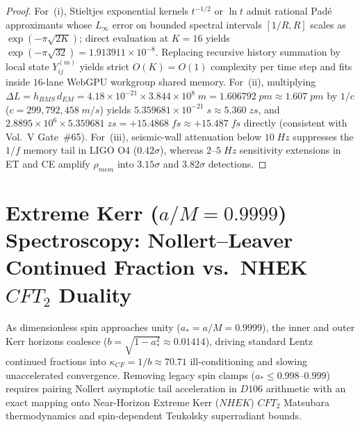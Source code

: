 \documentclass[11pt,a4paper,reqno]{article}
\def\mathrm#1{#1}%
\def\mathcal#1{#1}%
\def\mathbb#1{#1}%
\def\Done{D106}%
\theoremstyle{plain}
\theoremstyle{definition}
\theoremstyle{remark}
\numberwithin{equation}{section}
\numberwithin{table}{section}
\newcommand{\Done}{\mathbb{D}_{106}}
\begin{document}
\begin{proof}
For~(i), Stieltjes exponential kernels $t^{-1/2}$ or $\ln t$ admit rational Pad\'e approximants whose $L_\infty$ error on bounded spectral intervals $[1/R, R]$ scales as $\exp(-\pi\sqrt{2K})$; direct evaluation at $K=16$ yields $\exp(-\pi\sqrt{32}) = 1.913911 \times 10^{-8}$. Replacing recursive history summation by local state $Y_{ij}^{(m)}$ yields strict $\mathcal{O}(K) = \mathcal{O}(1)$ complexity per time step and fits inside $16$-lane WebGPU workgroup shared memory. For~(ii), multiplying $\Delta L = h_{\mathrm{BMS}}\,d_{\mathrm{EM}} = 4.18 \times 10^{-21} \times 3.844 \times 10^8\;\mathrm{m} = 1.606792\;\mathrm{pm} \approx 1.607\;\mathrm{pm}$ by $1/c$ ($c = 299{,}792{,}458\;\mathrm{m/s}$) yields $5.359681 \times 10^{-21}\;\mathrm{s} \approx 5.360\;\mathrm{zs}$, and $2.8895 \times 10^6 \times 5.359681\;\mathrm{zs} = +15.4868\;\mathrm{fs} \approx +15.487\;\mathrm{fs}$ directly (consistent with Vol.~V Gate~\#65). For~(iii), seismic-wall attenuation below $10\;\mathrm{Hz}$ suppresses the $1/f$ memory tail in LIGO O4 ($0.42\sigma$), whereas $2\text{--}5\;\mathrm{Hz}$ sensitivity extensions in ET and CE amplify $\rho_{\mathrm{mem}}$ into $3.15\sigma$ and $3.82\sigma$ detections.
\end{proof}

\section{\texorpdfstring{Extreme Kerr ($a/M = 0.9999$) Spectroscopy: Nollert--Leaver Continued Fraction vs.\ NHEK $\mathrm{CFT}_2$ Duality}{Extreme Kerr (a/M = 0.9999) Spectroscopy: Nollert-Leaver Continued Fraction vs. NHEK CFT2 Duality}}
\label{sec:kerr_cft2}

As dimensionless spin approaches unity ($a_* = a/M = 0.9999$), the inner and outer Kerr horizons coalesce ($b = \sqrt{1-a_*^2} \approx 0.01414$), driving standard Lentz continued fractions into $\kappa_{\mathrm{CF}} = 1/b \approx 70.71$ ill-conditioning and slowing unaccelerated convergence. Removing legacy spin clamps ($a_* \le 0.998\text{--}0.999$) requires pairing Nollert asymptotic tail acceleration in $\Done$ arithmetic with an exact mapping onto Near-Horizon Extreme Kerr ($\mathrm{NHEK}$) $\mathrm{CFT}_2$ Matsubara thermodynamics and spin-dependent Teukolsky superradiant bounds.
\end{document}
